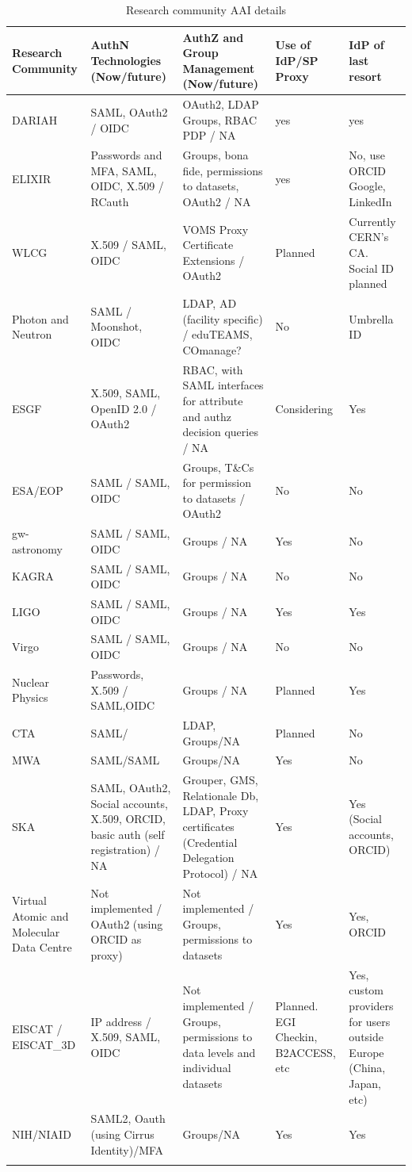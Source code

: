 \documentclass[fleqn,10pt]{wlscirep}
\begin{document}
{\begin{center}
\begin{longtable}{|p{3cm}|*{4}{p{}|}}
\hline
Research Community&AuthN Technologies (Now/future)&AuthZ and Group Management (Now/future)&Use of IdP/SP Proxy&IdP of last resort\\
\hline\hline
\endhead
DARIAH&SAML, OAuth2 / OIDC&OAuth2, LDAP Groups, RBAC PDP / NA&yes&yes\\
\hline
ELIXIR&Passwords and MFA, SAML, OIDC, X.509 / RCauth&Groups, bona fide, permissions to datasets, OAuth2 / NA&yes&No, use ORCID Google, LinkedIn\\
\hline
WLCG&X.509 / SAML,   OIDC&VOMS Proxy Certificate Extensions / OAuth2&Planned&Currently CERN’s CA. Social ID planned\\
\hline
Photon and Neutron&SAML / Moonshot, OIDC&LDAP, AD (facility specific) / eduTEAMS, COmanage?&No&Umbrella ID \\
\hline
ESGF&X.509, SAML, OpenID 2.0 / OAuth2&RBAC, with SAML interfaces for attribute and authz decision queries / NA&Considering&Yes\\
\hline
ESA/EOP&SAML / SAML, OIDC&Groups, T\&Cs for permission to datasets / OAuth2&No&No\\
\hline
gw-astronomy&SAML / SAML, OIDC&Groups / NA&Yes&No\\
\hline
KAGRA&SAML / SAML, OIDC&Groups / NA&No&No\\
\hline
LIGO&SAML / SAML, OIDC&Groups / NA&Yes&Yes\\
\hline
Virgo&SAML / SAML, OIDC&Groups / NA&No&No\\
\hline
Nuclear Physics&Passwords, X.509 / SAML,OIDC&Groups / NA&Planned&Yes\\
\hline
CTA &SAML/&LDAP, Groups/NA&Planned&No\\
\hline
MWA&SAML/SAML&Groups/NA&Yes&No\\
\hline
SKA&SAML, OAuth2, Social accounts, X.509, ORCID, basic auth (self registration) / NA&Grouper, GMS, Relationale Db, LDAP, Proxy certificates (Credential Delegation Protocol) / NA&Yes&Yes (Social accounts, ORCID)\\
\hline
Virtual Atomic and Molecular Data Centre&Not implemented / OAuth2 (using ORCID as proxy)&Not implemented / Groups, permissions to datasets&Yes&Yes, ORCID \\
\hline
EISCAT / EISCAT\_3D&IP address / X.509, SAML, OIDC&Not implemented / Groups, permissions to data levels and individual datasets&Planned. EGI Checkin, B2ACCESS, etc&Yes, custom providers for users outside Europe (China, Japan, etc) \\
\hline
NIH/NIAID&SAML2, Oauth (using Cirrus Identity)/MFA&Groups/NA&Yes&Yes\\ 
\hline
\caption{Research community AAI details}
\label{tab:table2}
\end{longtable}
\end{center}

}
\end{document}
